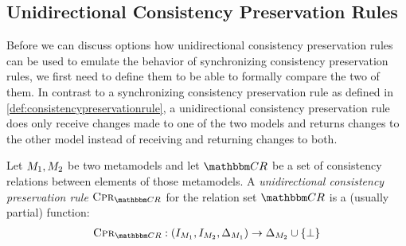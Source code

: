 


\subsection{Unidirectional Consistency Preservation Rules}

Before we can discuss options how unidirectional consistency preservation rules can be used to emulate the behavior of synchronizing consistency preservation rules, we first need to define them to be able to formally compare the two of them.
In contrast to a synchronizing consistency preservation rule as defined in \autoref{def:consistencypreservationrule}, a unidirectional consistency preservation rule does only receive changes made to one of the two models and returns changes to the other model instead of receiving and returning changes to both.

\begin{definition}
    \label{def:unidirectionalconsistencypreservationrule}
    Let $M_{1}, M_{2}$ be two metamodels and let $\consistencyrelationset{CR}$ be a set of consistency relations between elements of those metamodels.
    A \emph{unidirectional consistency preservation rule} $\consistencypreservationrule{\consistencyrelationset{CR}}$ for the relation set $\consistencyrelationset{CR}$ is a (usually partial) function:
    \begin{align*}
        \consistencypreservationrule{\consistencyrelationset{CR}} : (\metamodelinstanceset{M}{1}, \metamodelinstanceset{M}{2}, \changeuniverse{\metamodel{M}{1}}) \rightarrow \changeuniverse{\metamodel{M}{2}} \cup \setted{\bot}
    \end{align*}
\end{definition}


